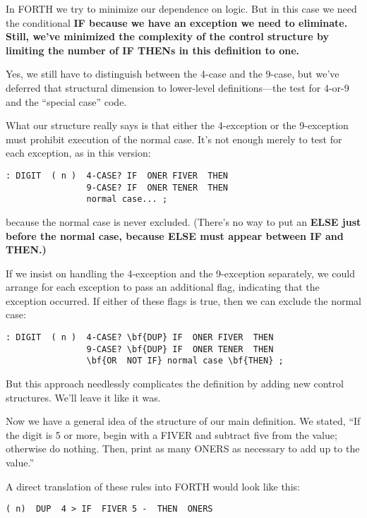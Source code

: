 In FORTH we try to minimize our dependence on logic. But in this
case we need the conditional \bf{IF} because we have an exception we need to
eliminate. Still, we've minimized the complexity of the control structure
by limiting the number of \bf{IF THEN}s in this definition to one.

Yes, we still have to distinguish between the 4-case and the 9-case,
but we've deferred that structural dimension to lower-level
definitions---the test for 4-or-9 and the ``special case'' code.

What our structure really says is that either the 4-exception or the
9-exception must prohibit execution of the normal case. It's not enough
merely to test for each exception, as in this version:

\begin{verbatim}
: DIGIT  ( n )  4-CASE? IF  ONER FIVER  THEN
                9-CASE? IF  ONER TENER  THEN
                normal case... ;
\end{verbatim}

because the normal case is never excluded. (There's no way to put an
\bf{ELSE} just before the normal case, because \bf{ELSE} must appear between
\bf{IF} and \bf{THEN}.)

If we insist on handling the 4-exception and the 9-exception
separately, we could arrange for each exception to pass an additional
flag, indicating that the exception occurred. If either of these flags is
true, then we can exclude the normal case:

\begin{verbatim}
: DIGIT  ( n )  4-CASE? \bf{DUP} IF  ONER FIVER  THEN
                9-CASE? \bf{DUP} IF  ONER TENER  THEN
                \bf{OR  NOT IF} normal case \bf{THEN} ;
\end{verbatim}

But this approach needlessly complicates the definition by adding new
control structures. We'll leave it like it was.

Now we have a general idea of the structure of our main definition.
We stated, ``If the digit is 5 or more, begin with a FIVER and subtract
five from the value; otherwise do nothing. Then, print as many
ONERS as necessary to add up to the value.''

A direct translation of these rules into FORTH would look like this:

\begin{verbatim}
( n)  DUP  4 > IF  FIVER 5 -  THEN  ONERS
\end{verbatim}

